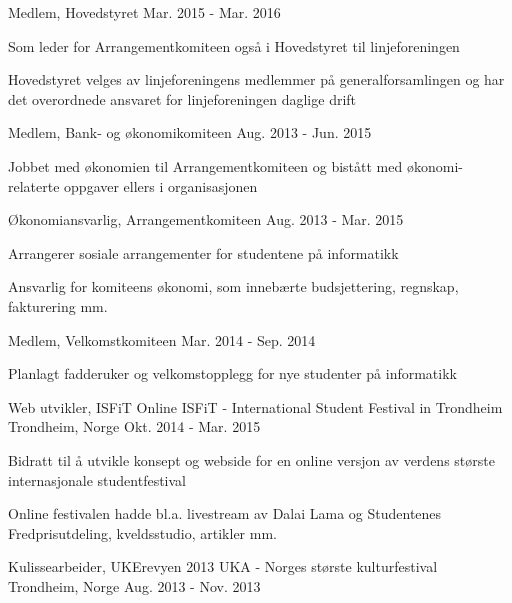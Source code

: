 \begin{cventries}
    \cventry
    {Medlem, Hovedstyret}
    {}
    {}
    {Mar. 2015 - Mar. 2016}
    {
      \begin{cvitems}
        \item {Som leder for Arrangementkomiteen også i Hovedstyret til linjeforeningen}
        \item {Hovedstyret velges av linjeforeningens medlemmer på generalforsamlingen og har det overordnede ansvaret for linjeforeningen daglige drift}
      \end{cvitems}
    }
    \cventry
    {Medlem, Bank- og økonomikomiteen}
    {}
    {}
    {Aug. 2013 - Jun. 2015}
    {
      \begin{cvitems}
        \item {Jobbet med økonomien til Arrangementkomiteen og bistått med økonomi-relaterte oppgaver ellers i organisasjonen}
      \end{cvitems}
    }
    \cventry
    {Økonomiansvarlig, Arrangementkomiteen}
    {}
    {}
    {Aug. 2013 - Mar. 2015}
    {
      \begin{cvitems}
        \item {Arrangerer sosiale arrangementer for studentene på informatikk}
        \item {Ansvarlig for komiteens økonomi, som innebærte budsjettering, regnskap, fakturering mm.}
      \end{cvitems}
    }
    \cventry
    {Medlem, Velkomstkomiteen}
    {}
    {}
    {Mar. 2014 - Sep. 2014}
    {
      \begin{cvitems}
        \item {Planlagt fadderuker og velkomstopplegg for nye studenter på informatikk}
      \end{cvitems}
    }
  \cventry
    {Web utvikler, ISFiT Online}
    {ISFiT - International Student Festival in Trondheim}
    {Trondheim, Norge}
    {Okt. 2014 - Mar. 2015}
    {
      \begin{cvitems}
        \item {Bidratt til å utvikle konsept og webside for en online versjon av verdens største internasjonale studentfestival}
        \item {Online festivalen hadde bl.a. livestream av Dalai Lama og Studentenes Fredprisutdeling, kveldsstudio, artikler mm.}
      \end{cvitems}
    }
  \cventry
    {Kulissearbeider, UKErevyen 2013}
    {UKA - Norges største kulturfestival}
    {Trondheim, Norge}
    {Aug. 2013 - Nov. 2013}
    {
      \begin{cvitems}

\end{cvitems}}
\end{cventries}
